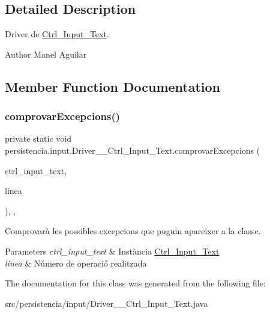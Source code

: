 \subsection{Detailed Description}
Driver de \hyperlink{classpersistencia_1_1input_1_1Ctrl__Input__Text}{Ctrl\+\_\+\+Input\+\_\+\+Text}. 

\begin{DoxyAuthor}{Author}
Manel Aguilar 
\end{DoxyAuthor}


\subsection{Member Function Documentation}
\mbox{\label{classpersistencia_1_1input_1_1Driver____Ctrl__Input__Text_a3e4149adb11b97b330ce77f1c2b5ae9c}} 
\subsubsection{\texorpdfstring{comprovar\+Excepcions()}{comprovarExcepcions()}}
{\footnotesize\ttfamily private static void persistencia.\+input.\+Driver\+\_\+\+\_\+\+Ctrl\+\_\+\+Input\+\_\+\+Text.\+comprovar\+Excepcions (\begin{DoxyParamCaption}\item[{\hyperlink{classpersistencia_1_1input_1_1Ctrl__Input__Text}{Ctrl\+\_\+\+Input\+\_\+\+Text}}]{ctrl\+\_\+input\+\_\+text,  }\item[{String}]{linea }\end{DoxyParamCaption})\hspace{0.3cm}{\ttfamily [inline]}, {\ttfamily [static]}, {\ttfamily [private]}}



Comprovarà les possibles excepcions que puguin apareixer a la classe. 


\begin{DoxyParams}{Parameters}
{\em ctrl\+\_\+input\+\_\+text} & Instància \hyperlink{classpersistencia_1_1input_1_1Ctrl__Input__Text}{Ctrl\+\_\+\+Input\+\_\+\+Text} \\
\hline
{\em linea} & Número de operació realitzada \\
\hline
\end{DoxyParams}


The documentation for this class was generated from the following file\+:\begin{DoxyCompactItemize}
\item 
src/persistencia/input/Driver\+\_\+\+\_\+\+Ctrl\+\_\+\+Input\+\_\+\+Text.\+java\end{DoxyCompactItemize}
